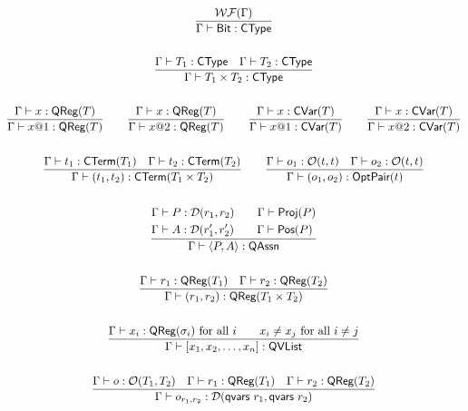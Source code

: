 \begin{gather*}
    \frac{\mathcal{WF}(\Gamma)}{\Gamma \vdash \textsf{Bit} : \textsf{CType}}
    \\
    \\
    \frac{\Gamma \vdash T_1 : \textsf{CType} \quad \Gamma \vdash T_2 : \textsf{CType}}{\Gamma \vdash T_1 \times T_2 : \textsf{CType}} \\
    \\
    \frac{\Gamma \vdash x : \textsf{QReg}(T)}{\Gamma \vdash x@1 : \textsf{QReg}(T)}
    \qquad
    \frac{\Gamma \vdash x : \textsf{QReg}(T)}{\Gamma \vdash x@2 : \textsf{QReg}(T)}
    \qquad
    \frac{\Gamma \vdash x : \textsf{CVar}(T)}{\Gamma \vdash x@1 : \textsf{CVar}(T)}
    \qquad
    \frac{\Gamma \vdash x : \textsf{CVar}(T)}{\Gamma \vdash x@2 : \textsf{CVar}(T)}
    \\
    \\
    \frac{
    \Gamma \vdash t_1 : \textsf{CTerm}(T_1) \quad \Gamma \vdash t_2 : \textsf{CTerm}(T_2)
    }
    {\Gamma \vdash (t_1, t_2) : \textsf{CTerm}(T_1 \times T_2)}
    \qquad
    \frac{\Gamma \vdash o_1 : \mathcal{O}(t, t) \quad \Gamma \vdash o_2 : \mathcal{O}(t, t)}{\Gamma \vdash (o_1, o_2) : \textsf{OptPair}(t)} \\
    \\
    \frac{
        \begin{aligned}
            & \Gamma \vdash P : \mathcal{D}(r_1, r_2) \qquad \Gamma \vdash \textsf{Proj}({P}) \\
            & \Gamma \vdash A : \mathcal{D}(r_1', r_2') \qquad \Gamma \vdash \textsf{Pos}({P})
        \end{aligned}
    }{\Gamma \vdash \langle P, A \rangle : \textsf{QAssn}} \\
    \\
    \frac{\Gamma \vdash r_1 : \textsf{QReg}(T_1) \quad \Gamma \vdash r_2 : \textsf{QReg}(T_2)}{\Gamma \vdash (r_1, r_2) : \textsf{QReg}(T_1 \times T_2)}
    \\
    \\
    \frac{\Gamma \vdash x_i : \textsf{QReg}(\sigma_i) \text{ for all } i \qquad x_i \neq x_j \text{ for all } i \neq j}{\Gamma \vdash [x_1, x_2, \dots, x_n] : \textsf{QVList}} \\
    \\
    \frac{\Gamma \vdash o : \mathcal{O}(T_1, T_2) \quad \Gamma \vdash r_1 : \textsf{QReg}(T_1) \quad \Gamma \vdash r_2 : \textsf{QReg}(T_2)}{\Gamma \vdash o_{r_1,r_2} : \mathcal{D}(\textsf{qvars}\ r_1, \textsf{qvars}\ r_2)}
\end{gather*}

